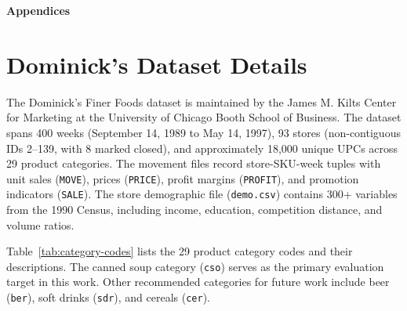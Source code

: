 \begin{center}
\Large\bfseries Appendices
\end{center}
\vspace{1em}

\section{Dominick's Dataset Details}
\label{app:dominicks}

The Dominick's Finer Foods dataset \citep{dominicks1999} is maintained by the James M. Kilts Center for Marketing at the University of Chicago Booth School of Business. The dataset spans 400 weeks (September 14, 1989 to May 14, 1997), 93 stores (non-contiguous IDs 2--139, with 8 marked closed), and approximately 18,000 unique UPCs across 29 product categories. The movement files record store-SKU-week tuples with unit sales (\texttt{MOVE}), prices (\texttt{PRICE}), profit margins (\texttt{PROFIT}), and promotion indicators (\texttt{SALE}). The store demographic file (\texttt{demo.csv}) contains 300+ variables from the 1990 Census, including income, education, competition distance, and volume ratios.

Table~\ref{tab:category-codes} lists the 29 product category codes and their descriptions. The canned soup category (\texttt{cso}) serves as the primary evaluation target in this work. Other recommended categories for future work include beer (\texttt{ber}), soft drinks (\texttt{sdr}), and cereals (\texttt{cer}).

